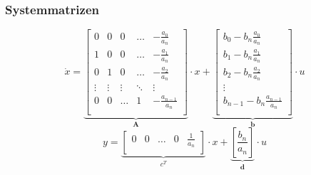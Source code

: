 	\subsubsection{Systemmatrizen}
\[
	\dot x=
	\underbrace{
		\begin{bmatrix}
			0 &	0 & 0 & \ldots & -\frac{a_0}{a_n}\\
			1 & 0 & 0 & \ldots & -\frac{a_1}{a_n}\\
			0 & 1 & 0 & \ldots & -\frac{a_2}{a_n}\\
			\vdots & \vdots & \vdots & \ddots & \vdots \\
			0 & 0 & \ldots & 1 &-\frac{a_{n-1}}{a_n}\\	
		\end{bmatrix}
	}_{\textbf{A}}
	\cdot x +
	\underbrace{
		\begin{bmatrix}
			b_0-b_n\frac{a_0}{a_n} \\
			b_1-b_n\frac{a_1}{a_n} \\
			b_2-b_n\frac{a_2}{a_n}  \\
			\vdots\\
			b_{n-1}-b_n\frac{a_{n-1}}{a_n}\\	
		\end{bmatrix}
	}_{\textbf{b}}
	\cdot u	
\]
\[
	y=
	\underbrace{
			\begin{bmatrix}
				0 & 0 & \ldots & 0 & \frac{1}{a_n}\\
			\end{bmatrix}
	}_{\textbf{$c^T$}}
	\cdot x  +
	\underbrace{
		\left[ \frac{b_n}{a_n} \right] 
	}_{\textbf{d}}
	\cdot u
\]